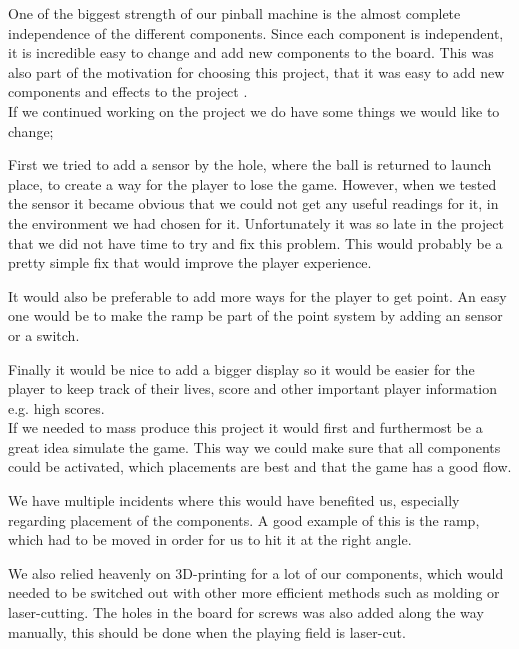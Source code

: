 
One of the biggest strength of our pinball machine is the almost complete independence of the different components. 
Since each component is independent, it is incredible easy to change and add new components to the board. This was also part of the motivation for choosing this project, that it was easy to add new components and effects to the project .\\

If we continued working on the project we do have some things we would like to change; 

First we tried to add a sensor by the hole, where the ball is returned to launch place, to create a way for the player to lose the game. However, when we tested the sensor it became obvious that we could not get any useful readings for it, in the environment we had chosen for it. Unfortunately it was so late in the project that we did not have time to try and fix this problem. This would probably be a pretty simple fix that would improve the player experience.

It would also be preferable to add more ways for the player to get point. An easy one would be to make the ramp be part of the point system by adding an sensor or a switch.

Finally it would be nice to add a bigger display so it would be easier for the player to keep track of their lives, score and other important player information e.g. high scores.\\

If we needed to mass produce this project it would first and furthermost be a great idea simulate the game. This way we could make sure that all components could be activated, which placements are best and that the game has a good flow.

We have multiple incidents where this would have benefited us, especially regarding placement of the components. A good example of this is the ramp, which had to be moved in order for us to hit it at the right angle.

We also relied heavenly on 3D-printing for a lot of our components, which would needed to be switched out with other more efficient methods such as molding or laser-cutting. The holes in the board for screws was also added along the way manually, this should be done when the playing field is laser-cut. 

